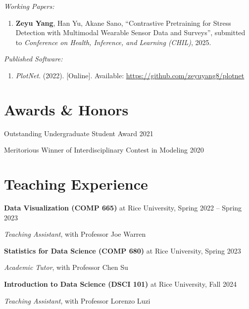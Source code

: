 \documentclass[11pt]{article}
\begin{document}
\vspace{\lineskip}

\textit{Working Papers:}

\begin{enumerate}[resume]
    \item \label{akane-clsp} \textbf{Zeyu Yang}, Han Yu, Akane Sano, ``Contrastive Pretraining for Stress Detection with Multimodal Wearable Sensor Data and Surveys'', submitted to \textit{Conference on Health, Inference, and Learning (CHIL)}, 2025.
\end{enumerate}

\vspace{\lineskip}

\textit{Published Software:}

\begin{enumerate}[resume]
    \item \label{joe-plotnet} \textit{PlotNet}. (2022). [Online]. Available: \url{https://github.com/zeyuyang8/plotnet}
\end{enumerate}

\section*{Awards \& Honors}

Outstanding Undergraduate Student Award \hfill 2021

Meritorious Winner of Interdisciplinary Contest in Modeling \hfill 2020

\section*{Teaching Experience}

\textbf{Data Visualization (COMP 665)} at Rice University, \hfill Spring 2022 -- Spring 2023

\textit{Teaching Assistant}, with Professor Joe Warren

\vspace{\lineskip}

\textbf{Statistics for Data Science (COMP 680)} at Rice University, \hfill Spring 2023

\textit{Academic Tutor}, with Professor Chen Su

\vspace{\lineskip}

\textbf{Introduction to Data Science (DSCI 101)} at Rice University, \hfill Fall 2024

\textit{Teaching Assistant}, with Professor Lorenzo Luzi
\end{document}

